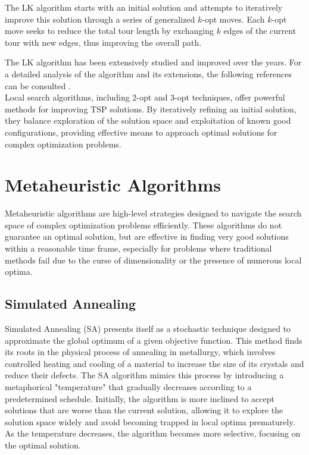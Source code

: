 The \Gls{LK} algorithm starts with an initial solution and attempts to iteratively improve this solution through a series of generalized \(k\)-opt moves. Each \(k\)-opt move seeks to reduce the total tour length by exchanging \(k\) edges of the current tour with new edges, thus improving the overall path.


The \Gls{LK} algorithm has been extensively studied and improved over the years. For a detailed analysis of the algorithm and its extensions, the following references can be consulted \cite{Johnson2002,Lawler1985,Gutin2016}.
\\

Local search algorithms, including 2-opt and 3-opt techniques, offer powerful methods for improving \Gls{TSP} solutions. By iteratively refining an initial solution, they balance exploration of the solution space and exploitation of known good configurations, providing effective means to approach optimal solutions for complex optimization problems.


\section{Metaheuristic Algorithms}

Metaheuristic algorithms are high-level strategies designed to navigate the search space of complex optimization problems efficiently. These algorithms do not guarantee an optimal solution, but are effective in finding very good solutions within a reasonable time frame, especially for problems where traditional methods fail due to the curse of dimensionality or the presence of numerous local optima.

\subsection{Simulated Annealing}

Simulated Annealing (\Gls{SA}) presents itself as a stochastic technique designed to approximate the global optimum of a given objective function. This method finds its roots in the physical process of annealing in metallurgy, which involves controlled heating and cooling of a material to increase the size of its crystals and reduce their defects. The SA algorithm mimics this process by introducing a metaphorical "temperature" that gradually decreases according to a predetermined schedule. Initially, the algorithm is more inclined to accept solutions that are worse than the current solution, allowing it to explore the solution space widely and avoid becoming trapped in local optima prematurely. As the temperature decreases, the algorithm becomes more selective, focusing on the optimal solution.

